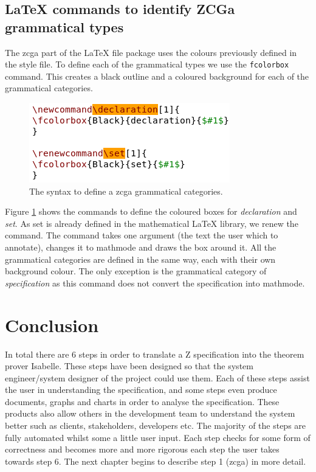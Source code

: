 \subsection{\LaTeX{} commands to identify ZCGa grammatical types}

The \gls{zcga} part of the \LaTeX{} file package uses the colours previously defined in the style file. To define each of the grammatical types we use the \texttt{fcolorbox} command. This creates a black outline and a coloured background for each of the grammatical categories.

\begin{figure}[H]
\includegraphics[scale=0.7]{Figures/Design/zmathe.png}
\caption{The syntax to define a \gls{zcga} grammatical categories. \label{fig:latexzcga}}
\end{figure}

Figure \ref{fig:latexzcga} shows the commands to define the coloured boxes for \emph{declaration} and \emph{set}. As set is already defined in the mathematical \LaTeX{} library, we renew the command. The command takes one argument (the text the user which to annotate), changes it to mathmode and draws the box around it. All the grammatical categories are defined in the same way, each with their own background colour. The only exception is the grammatical category of \emph{specification} as this command does not convert the specification into mathmode.

\section{Conclusion}

In total there are 6 steps in order to translate a Z specification into the theorem prover Isabelle. These steps have been designed so that the system engineer/system designer of the project could use them.  Each of these steps assist the user in understanding the specification, and some steps even produce documents, graphs and charts in order to analyse the specification. These products also allow others in the development team to understand the system better such as clients, stakeholders, developers etc. The majority of the steps are fully automated whilst some a little user input. Each step checks for some form of correctness and becomes more and more rigorous each step the user takes towards step 6. The next chapter begins to describe step 1 (\gls{zcga}) in more detail.